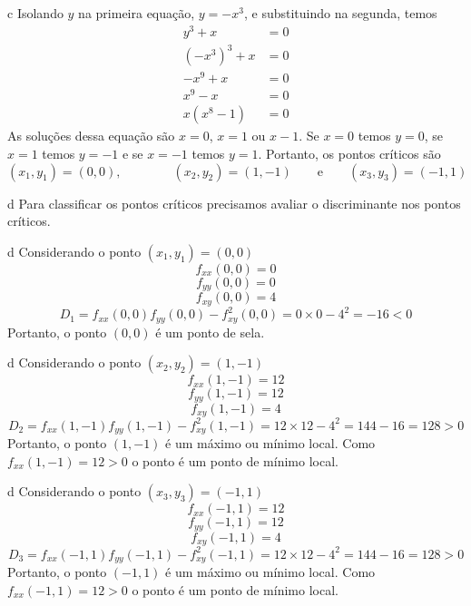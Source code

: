 \begin{resolution}{c}
  Isolando $y$ na primeira equação, \(y = -x^3\), e substituindo na segunda, temos
  \begin{align*}
    y^3 + x                 & = 0 \\
    \left(-x^3\right)^3 + x & = 0 \\
    -x^9 + x                & = 0 \\
    x^9 - x                 & = 0 \\
    x(x^8 - 1)              & = 0
  \end{align*}
  As soluções dessa equação são $x=0$, $x=1$ ou $x-1$.
  Se $x=0$ temos $y=0$,
  se $x=1$ temos $y=-1$ e
  se $x=-1$ temos $y=1$.
  Portanto, os pontos críticos são
  \[
    (x_1, y_1) = (0, 0),
    \qquad\qquad
    (x_2, y_2) = (1, -1)
    \qquad\text{e}\qquad
    (x_3, y_3) = (-1, 1)
  \]
\end{resolution}

\begin{resolution}{d}
  Para classificar os pontos críticos precisamos avaliar o discriminante nos
  pontos críticos.
\end{resolution}

\begin{resolution}{d}
  Considerando o ponto \((x_1, y_1) = (0, 0)\)
  \[
  f_{xx}(0, 0) = 0
  \]
  \[
  f_{yy}(0, 0) = 0
  \]
  \[
  f_{xy}(0, 0) = 4
  \]
  \[
  D_1
  = f_{xx}(0, 0)f_{yy}(0, 0) - f^2_{xy}(0, 0)
  = 0 \times 0 - 4^2
  = -16 < 0
  \]
  Portanto, o ponto $(0, 0)$ é um ponto de sela.
\end{resolution}

\begin{resolution}{d}
  Considerando o ponto \((x_2, y_2) = (1, -1)\)
  \[
    f_{xx}(1, -1) = 12
  \]
  \[
    f_{yy}(1, -1) = 12
  \]
  \[
    f_{xy}(1, -1) = 4
  \]
  \[
    D_2
    = f_{xx}(1, -1)f_{yy}(1, -1) - f^2_{xy}(1, -1)
    = 12 \times 12 - 4^2
    = 144 -16
    = 128 > 0
  \]
  Portanto, o ponto $(1, -1)$ é um máximo ou mínimo local.
  Como \(f_{xx}(1, -1) = 12 > 0\)
  o ponto é um ponto de mínimo local.
\end{resolution}

\begin{resolution}{d}
  Considerando o ponto \((x_3, y_3) = (-1, 1)\)
  \[
    f_{xx}(-1, 1) = 12
  \]
  \[
    f_{yy}(-1, 1) = 12
  \]
  \[
    f_{xy}(-1, 1) = 4
  \]
  \[
    D_3
    = f_{xx}(-1, 1)f_{yy}(-1, 1) - f^2_{xy}(-1, 1)
    = 12 \times 12 - 4^2
    = 144 -16
    = 128 > 0
  \]
  Portanto, o ponto $(-1, 1)$ é um máximo ou mínimo local.
  Como \(f_{xx}(-1, 1) = 12 > 0\)
  o ponto é um ponto de mínimo local.
\end{resolution}

